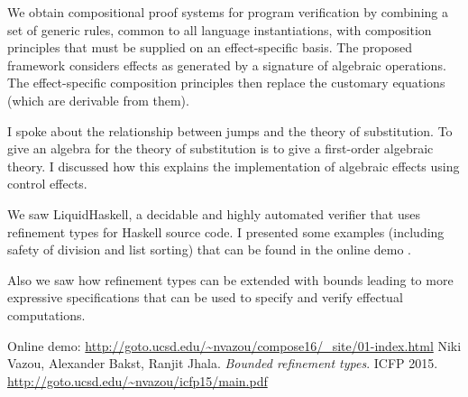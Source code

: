 \documentclass[a4paper,UKenglish]{dagrep}
\begin{document}
\license

We obtain compositional proof systems for program verification by combining a set of generic rules, common to all language instantiations, with composition principles that must be supplied on an effect-specific basis. The proposed framework considers effects as generated by a signature of algebraic operations. The effect-specific composition principles then replace the customary equations (which are derivable from them).

\license
{}

I spoke about the relationship between jumps and the theory of substitution. To give an algebra for the theory of substitution is to give a first-order algebraic theory. I discussed how this explains the implementation of algebraic effects using control effects.

\license
{}

We saw LiquidHaskell, a decidable and highly automated verifier that uses
refinement types for Haskell source code. I presented some examples (including
safety of division and list sorting) that can be found in the online demo
\cite{demo}.

Also we saw how refinement types can be extended with bounds \cite{icfp-paper}
leading to more expressive specifications that can be used to specify and
verify effectual computations.


\begin{thebibliography}{0}
 Online demo: \url{http://goto.ucsd.edu/~nvazou/compose16/_site/01-index.html}
 Niki Vazou, Alexander Bakst, Ranjit Jhala. \emph{Bounded
refinement types}. ICFP 2015. \url{http://goto.ucsd.edu/~nvazou/icfp15/main.pdf}
\end{thebibliography}
\end{document}
